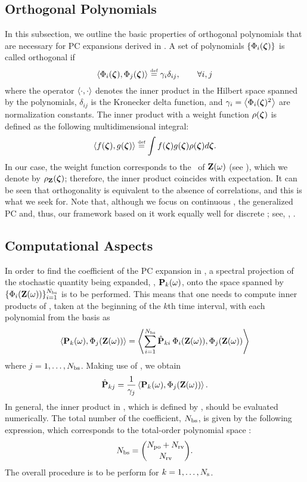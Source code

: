 \subsection{Orthogonal Polynomials} 
In this subsection, we outline the basic properties of orthogonal polynomials that are necessary for PC expansions derived in . A set of polynomials $\{ \Phi_i(\boldsymbol{\zeta}) \}$ is called orthogonal if
\begin{equation} \elabel{orthogonality}
  \oInner{\pcb_i(\vz)}{\pcb_j(\vz)} \eqdef \pcn_i \delta_{ij}, \qquad \forall i, j
\end{equation}
where the operator $\oInner{\idot}{\idot}$ denotes the inner product in the Hilbert space spanned by the polynomials, $\delta_{ij}$ is the Kronecker delta function, and $\pcn_i = \oInner{\pcb_i(\vz)^2}$ are normalization constants. The inner product with a weight function $\rho(\boldsymbol{\zeta})$ is defined as the following multidimensional integral:
\begin{equation} \elabel{inner-product}
  \oInner{f(\vz)}{g(\vz)} \eqdef \int f(\vz) g(\vz) \PDF(\vz) d\vz.
\end{equation}
In our case, the weight function corresponds to the \pdf\ of $\mathbf{Z}(\omega)$ (see ), which we denote by $\rho_{\mathbf{Z}}(\boldsymbol{\zeta})$; therefore, the inner product coincides with expectation. It can be seen that orthogonality is equivalent to the absence of correlations, and this is what we seek for. Note that, although we focus on continuous \rvs, the generalized PC and, thus, our framework based on it work equally well for discrete \rvs; see, \eg, \cite{xiu2010, maitre2010, xiu2002}.

\subsection{Computational Aspects} 
In order to find the coefficient of the PC expansion in , a spectral projection of the stochastic quantity being expanded, \ie, $\mathbf{P}_k(\omega)$, onto the space spanned by $\{ \Phi_i(\mathbf{Z}(\omega)) \}_{i = 1}^{{N_\text{bs}}}$ is to be performed. This means that one needs to compute inner products of , taken at the beginning of the $k$th time interval, with each polynomial from the basis as
\[
  \oInner{\vP_k(\o)}{\pcb_j(\vZ(\o))} = \oInner{\sum_{i=1}^{\pcterms} \pcc{\vP}_{ki} \: \pcb_i(\vZ(\o))}{\pcb_j(\vZ(\o))}
\]
where $j = 1, \dotsc, {N_\text{bs}}$. Making use of , we obtain
\begin{equation} \elabel{pc-coefficients}
  \pcc{\vP}_{kj} = \frac{1}{\pcn_j} \oInner{\vP_k(\o)}{\pcb_j(\vZ(\o))}.
\end{equation}
In general, the inner product in , which is defined by , should be evaluated numerically. The total number of the coefficient, ${N_\text{bs}}$, is given by the following expression, which corresponds to the total-order polynomial space \cite{beck2011}:
\begin{equation} \elabel{pc-terms}
  \pcterms = { \pcorder + \vars \choose \vars }.
\end{equation}
The overall procedure is to be perform for $k = 1, \dotsc, N_\text{s}$.

